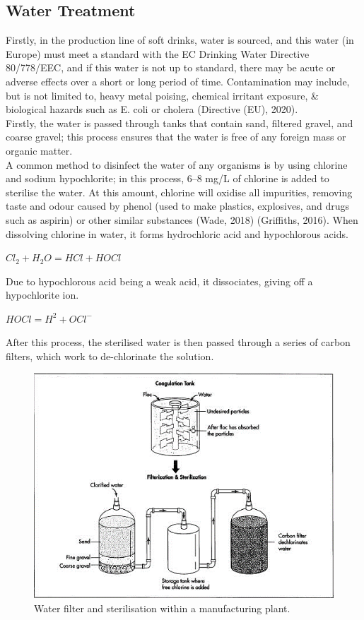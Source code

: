 \subsection{Water Treatment}
Firstly, in the production line of soft drinks, water is sourced, and this water (in Europe) must meet a standard with the EC Drinking Water Directive 80/778/EEC, and if this water is not up to standard, there may be acute or adverse effects over a short or long period of time. Contamination may include, but is not limited to, heavy metal poising, chemical irritant exposure, \& biological hazards such as E. coli or cholera (Directive (EU), 2020).\\
Firstly, the water is passed through tanks that contain sand, filtered gravel, and coarse gravel; this process ensures that the water is free of any foreign mass or organic matter. \\
A common method to disinfect the water of any organisms is by using chlorine and sodium hypochlorite; in this process, 6–8 mg/L of chlorine is added to sterilise the water. At this amount, chlorine will oxidise all impurities, removing taste and odour caused by phenol (used to make plastics, explosives, and drugs such as aspirin) or other similar substances (Wade, 2018) (Griffiths, 2016).
When dissolving chlorine in water, it forms hydrochloric acid and hypochlorous acids. \newline
\begin{center}
    \begin{math}
    Cl_{2} + H_{2}O = HCl + HOCl
\end{math}
\end{center}
\newpage
Due to hypochlorous acid being a weak acid, it dissociates, giving off a hypochlorite ion.

\begin{center}
    \begin{math}
    HOCl = H^{2} + OCl^{-} 
\end{math}
\end{center}


After this process, the sterilised water is then passed through a series of carbon filters, which work to de-chlorinate the solution.
\begin{figure}[htp]
    \centering
    \includegraphics[width=0.5\linewidth]{assets/5.png}
    \caption{Water filter and sterilisation within a manufacturing plant.}
    \label{fig:enter-label}
\end{figure}

